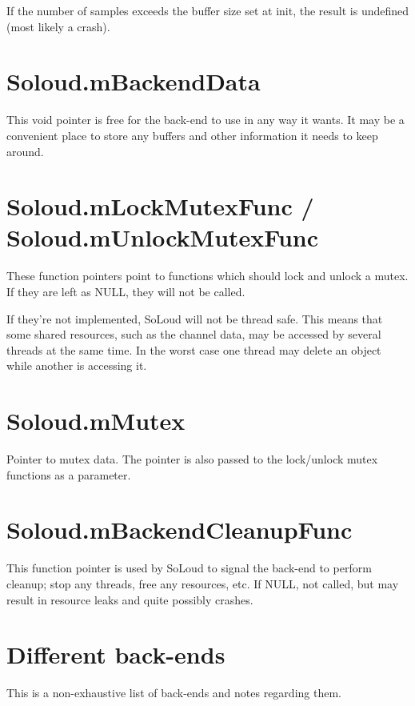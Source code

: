 If the number of samples exceeds the buffer size set at init, the result is undefined (most likely a crash).

\section{Soloud.mBackendData}

This void pointer is free for the back-end to use in any way it wants. It may be a convenient place to store any buffers and other information it needs to keep around.

\section{Soloud.mLockMutexFunc / Soloud.mUnlockMutexFunc}

These function pointers point to functions which should lock and unlock a mutex. If they are left as NULL, they will not be called.

If they're not implemented, SoLoud will not be thread safe. This means that some shared resources, such as the channel data, may be accessed by several threads at the same time. In the worst case one thread may delete an object while another is accessing it.

\section{Soloud.mMutex}

Pointer to mutex data. The pointer is also passed to the lock/unlock mutex functions as a parameter.

\section{Soloud.mBackendCleanupFunc}

This function pointer is used by SoLoud to signal the back-end to perform cleanup; stop any threads, free any resources, etc. If NULL, not called, but may result in resource leaks and quite possibly crashes.

\section{Different back-ends}

This is a non-exhaustive list of back-ends and notes regarding them.

